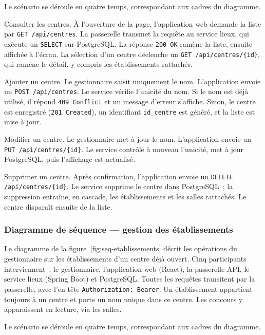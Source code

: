\begin{onehalfspace}
Le scénario se déroule en quatre temps, correspondant aux cadres du diagramme.

Consulter les centres. À l'ouverture de la page, l'application web demande la liste par \texttt{GET /api/centres}. La passerelle transmet la requête au service lieux, qui exécute un \texttt{SELECT} sur PostgreSQL. La réponse \texttt{200 OK} ramène la liste, ensuite affichée à l'écran. La sélection d'un centre déclenche un \texttt{GET /api/centres/\{id\}}, qui ramène le détail, y compris les établissements rattachés.

Ajouter un centre. Le gestionnaire saisit uniquement le nom. L'application envoie un \texttt{POST /api/centres}. Le service vérifie l'unicité du nom. Si le nom est déjà utilisé, il répond \texttt{409 Conflict} et un message d'erreur s'affiche. Sinon, le centre est enregistré (\texttt{201 Created}), un identifiant \texttt{id\_centre} est généré, et la liste est mise à jour.

Modifier un centre. Le gestionnaire met à jour le nom. L'application envoie un \texttt{PUT /api/centres/\{id\}}. Le service contrôle à nouveau l'unicité, met à jour PostgreSQL, puis l'affichage est actualisé.

Supprimer un centre. Après confirmation, l'application envoie un \texttt{DELETE /api/centres/\{id\}}. Le service supprime le centre dans PostgreSQL~; la suppression entraîne, en cascade, les établissements et les salles rattachés. Le centre disparaît ensuite de la liste.

\subsubsection{Diagramme de séquence --- gestion des établissements}

Le diagramme de la figure~\ref{fig:seq-etablissements} décrit les opérations du gestionnaire sur les établissements d'un centre déjà ouvert. Cinq participants interviennent~: le gestionnaire, l'application web (React), la passerelle API, le service lieux (Spring Boot) et PostgreSQL. Toutes les requêtes transitent par la passerelle, avec l'en-tête \texttt{Authorization: Bearer}. Un établissement appartient toujours à un centre et porte un nom unique dans ce centre. Les concours y apparaissent en lecture, via les salles.


Le scénario se déroule en quatre temps, correspondant aux cadres du diagramme.


\end{onehalfspace}
